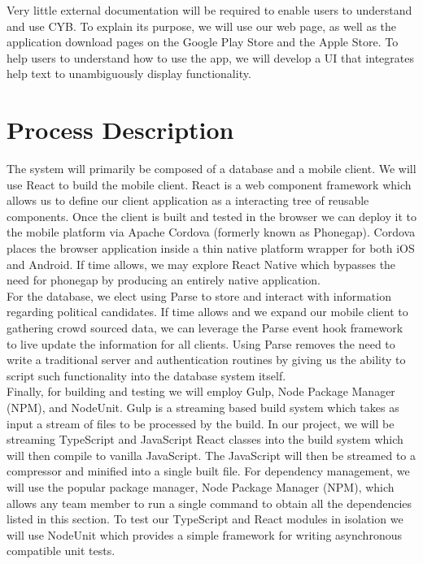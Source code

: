 \documentclass[11pt]{article}
\begin{document}
Very little external documentation will be required to enable users to understand and use CYB. To explain its purpose, we will use our web page, as well as the application download pages on the Google Play Store and the Apple Store. To help users to understand how to use the app, we will develop a UI that integrates help text to unambiguously display functionality.

\section*{Process Description}

The system will primarily be composed of a database and a mobile client. We will use React to build the mobile client. React is a web component framework which allows us to define our client application as a interacting tree of reusable components. Once the client is built and tested in the browser we can deploy it to the mobile platform via Apache Cordova (formerly known as Phonegap). Cordova places the browser application inside a thin native platform wrapper for both iOS and Android. If time allows, we may explore React Native which bypasses the need for phonegap by producing an entirely native application.\\

For the database, we elect using Parse to store and interact with information regarding political candidates. If time allows and we expand our mobile client to gathering crowd sourced data, we can leverage the Parse event hook framework to live update the information for all clients. Using Parse removes the need to write a traditional server and authentication routines by giving us the ability to script such functionality into the database system itself.\\

Finally, for building and testing we will employ Gulp, Node Package Manager (NPM), and NodeUnit. Gulp is a streaming based build system which takes as input a stream of files to be processed by the build. In our project, we will be streaming TypeScript and JavaScript React  classes into the build system which will then compile to vanilla JavaScript. The JavaScript will then be streamed to a compressor and minified into a single built file. For dependency management, we will use the popular package manager, Node Package Manager (NPM), which allows any team member to run a single command to obtain all the dependencies listed in this section. To test our TypeScript and React modules in isolation we will use NodeUnit which provides a simple framework for writing asynchronous compatible unit tests.
\end{document}
